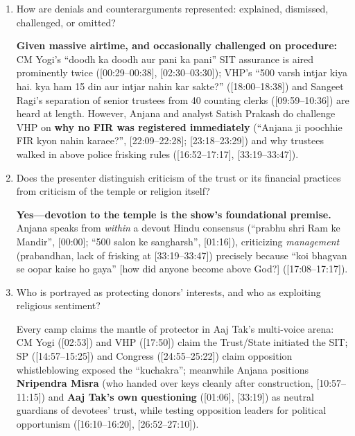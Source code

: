 \documentclass[10pt,a4paper]{article}
\begin{document}
\begin{enumerate}[leftmargin=1.5em, itemsep=6pt, topsep=4pt]
  \item How are denials and counterarguments represented: explained, dismissed, challenged, or omitted?\par\smallskip
  \textbf{Given massive airtime, and occasionally challenged on procedure:} CM Yogi's ``doodh ka doodh aur pani ka pani'' SIT assurance is aired prominently twice ([00:29--00:38], [02:30--03:30]); VHP's ``500 varsh intjar kiya hai. kya ham 15 din aur intjar nahin kar sakte?'' ([18:00--18:38]) and Sangeet Ragi's separation of senior trustees from 40 counting clerks ([09:59--10:36]) are heard at length. However, Anjana and analyst Satish Prakash do challenge VHP on \textbf{why no FIR was registered immediately} (``Anjana ji poochhie FIR kyon nahin karaee?'', [22:09--22:28]; [23:18--23:29]) and why trustees walked in above police frisking rules ([16:52--17:17], [33:19--33:47]).
  \item Does the presenter distinguish criticism of the trust or its financial practices from criticism of the temple or religion itself?\par\smallskip
  \textbf{Yes---devotion to the temple is the show's foundational premise.} Anjana speaks from \emph{within} a devout Hindu consensus (``prabhu shri Ram ke Mandir'', [00:00]; ``500 salon ke sangharsh'', [01:16]), criticizing \emph{management} (prabandhan, lack of frisking at [33:19--33:47]) precisely because ``koi bhagvan se oopar kaise ho gaya'' [how did anyone become above God?] ([17:08--17:17]).
  \item Who is portrayed as protecting donors' interests, and who as exploiting religious sentiment?\par\smallskip
  Every camp claims the mantle of protector in Aaj Tak's multi-voice arena: CM Yogi ([02:53]) and VHP ([17:50]) claim the Trust/State initiated the SIT; SP ([14:57--15:25]) and Congress ([24:55--25:22]) claim opposition whistleblowing exposed the ``kuchakra''; meanwhile Anjana positions \textbf{Nripendra Misra} (who handed over keys cleanly after construction, [10:57--11:15]) and \textbf{Aaj Tak's own questioning} ([01:06], [33:19]) as neutral guardians of devotees' trust, while testing opposition leaders for political opportunism ([16:10--16:20], [26:52--27:10]).
\end{enumerate}
\end{document}
